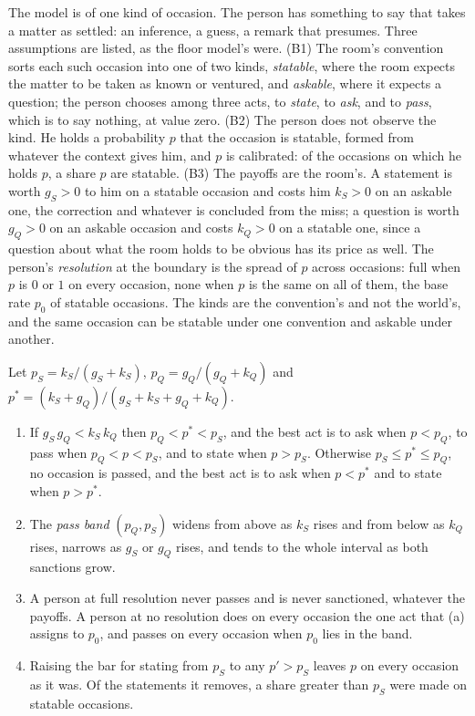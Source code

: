 The model is of one kind of occasion. The person has something to say that takes a matter as settled: an inference, a guess, a remark that presumes. Three assumptions are listed, as the floor model's were. (B1) The room's convention sorts each such occasion into one of two kinds, \emph{statable}, where the room expects the matter to be taken as known or ventured, and \emph{askable}, where it expects a question; the person chooses among three acts, to \emph{state}, to \emph{ask}, and to \emph{pass}, which is to say nothing, at value zero. (B2) The person does not observe the kind. He holds a probability $p$ that the occasion is statable, formed from whatever the context gives him, and $p$ is calibrated: of the occasions on which he holds $p$, a share $p$ are statable. (B3) The payoffs are the room's. A statement is worth $g_S > 0$ to him on a statable occasion and costs him $k_S > 0$ on an askable one, the correction and whatever is concluded from the miss; a question is worth $g_Q > 0$ on an askable occasion and costs $k_Q > 0$ on a statable one, since a question about what the room holds to be obvious has its price as well. The person's \emph{resolution} at the boundary is the spread of $p$ across occasions: full when $p$ is $0$ or $1$ on every occasion, none when $p$ is the same on all of them, the base rate $p_0$ of statable occasions. The kinds are the convention's and not the world's, and the same occasion can be statable under one convention and askable under another.

\begin{proposition}\label{prop:passband}
Let $p_S = k_S/(g_S + k_S)$, $p_Q = g_Q/(g_Q + k_Q)$ and $p^{*} = (k_S + g_Q)/(g_S + k_S + g_Q + k_Q)$.
\begin{enumerate}[label=(\alph*)]
\item If $g_S\,g_Q < k_S\,k_Q$ then $p_Q < p^{*} < p_S$, and the best act is to ask when $p < p_Q$, to pass when $p_Q < p < p_S$, and to state when $p > p_S$. Otherwise $p_S \le p^{*} \le p_Q$, no occasion is passed, and the best act is to ask when $p < p^{*}$ and to state when $p > p^{*}$.
\item The \emph{pass band} $(p_Q, p_S)$ widens from above as $k_S$ rises and from below as $k_Q$ rises, narrows as $g_S$ or $g_Q$ rises, and tends to the whole interval as both sanctions grow.
\item A person at full resolution never passes and is never sanctioned, whatever the payoffs. A person at no resolution does on every occasion the one act that (a) assigns to $p_0$, and passes on every occasion when $p_0$ lies in the band.
\item Raising the bar for stating from $p_S$ to any $p' > p_S$ leaves $p$ on every occasion as it was. Of the statements it removes, a share greater than $p_S$ were made on statable occasions.
\end{enumerate}
\end{proposition}

